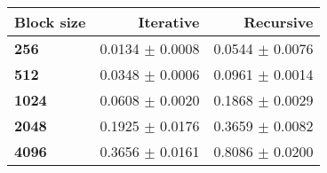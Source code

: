 \begin{tabular}{lrr}\toprule
\textbf{Block size}  & \textbf{Iterative} & \textbf{Recursive}\\\midrule
\textbf{256}  & 0.0134 $\pm$ 0.0008 & 0.0544 $\pm$ 0.0076\\
\textbf{512}  & 0.0348 $\pm$ 0.0006 & 0.0961 $\pm$ 0.0014\\
\textbf{1024}  & 0.0608 $\pm$ 0.0020 & 0.1868 $\pm$ 0.0029\\
\textbf{2048}  & 0.1925 $\pm$ 0.0176 & 0.3659 $\pm$ 0.0082\\
\textbf{4096} & 0.3656 $\pm$ 0.0161 & 0.8086 $\pm$ 0.0200\\
\bottomrule
\end{tabular}
